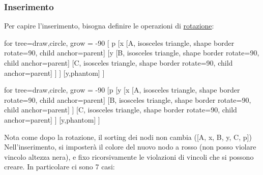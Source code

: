 \subsubsection{Inserimento}
Per capire l'inserimento, bisogna definire le operazioni di \underline{rotazione}:
\vskip3mm
\begin{minipage}[t]{0.48\textwidth}
	\begin{center}
		\begin{forest}
			for tree={draw,circle, grow = -90}
			[
			p
				[x
						[A, isosceles triangle, shape border rotate=90, child anchor=parent]
						[y
								[B, isosceles triangle, shape border rotate=90, child anchor=parent]
								[C, isosceles triangle, shape border rotate=90, child anchor=parent]
						]
				]
				[y,phantom]
			]
		\end{forest}
	\end{center}
\end{minipage}
%
\begin{minipage}[t]{0.48\textwidth}
	\begin{center}
		\begin{forest}
			for tree={draw,circle, grow = -90}
			[p
				[y
						[x
								[A, isosceles triangle, shape border rotate=90, child anchor=parent]
								[B, isosceles triangle, shape border rotate=90, child anchor=parent]
						]
						[C, isosceles triangle, shape border rotate=90, child anchor=parent]
				]
				[y,phantom]
			]
		\end{forest}
	\end{center}
\end{minipage}
\vskip3mm
Nota come dopo la rotazione, il sorting dei nodi non cambia ([A, x, B, y, C, p])
\vskip3mm
Nell'inserimento, si imposterà il colore del nuovo nodo a rosso (non posso violare vincolo altezza nera), e fixo ricorsivamente le violazioni di vincoli che si possono creare. In particolare ci sono 7 casi:

